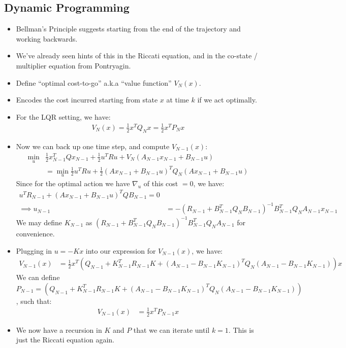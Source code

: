 \subsection{Dynamic Programming}
\begin{itemize}
    \item Bellman's Principle suggests starting from the end of the trajectory and working backwards. 
    \item We've already seen hints of this in the Riccati equation, and in the co-state / multiplier equation from Pontryagin. 
    \item Define ``optimal cost-to-go'' a.k.a ``value function'' $V_N(x)$.
    \item Encodes the cost incurred starting from state $x$ at time $k$ if we act optimally. 
    \item For the LQR setting, we have: 
    \begin{align}
        V_N(x) = \frac{1}{2} x^T Q_N x = \frac{1}{2} x^T P_N x  
    \end{align}
    \item Now we can back up one time step, and compute $V_{N-1}(x)$:
    \begin{align}
        \min_u & \frac{1}{2} x_{N-1}^T Q x_{N-1} + \frac{1}{2} u^T R u + V_N (A_{N-1} x_{N-1} + B_{N-1} u) \\
        &= \min_u \frac{1}{2} u^T R u + \frac{1}{2} (A x_{N-1} + B_{N-1} u)^T Q_N  (A x_{N-1} + B_{N-1} u)
    \end{align}
    Since for the optimal action we have $\nabla_u $ of this cost $=0$, we have: 
\begin{align}
    u^T R_{N-1} + (A x_{N-1} + B_{N-1} u)^T Q B_{N-1} = 0 \\
    \implies u_{N-1} &= -(R_{N-1} + B_{N-1}^T Q_N B_{N-1})^{-1} B_{N-1}^T Q_N A_{N-1} x_{N-1} 
\end{align}
    We may define $K_{N-1}$ as $(R_{N-1} + B_{N-1}^T Q_N B_{N-1})^{-1} B_{N-1}^T Q_N A_{N-1}$ for convenience. 
    \item Plugging in $u=-Kx$ into our expression for $V_{N-1}(x)$, we have: 
    \begin{align}
        V_{N-1}(x) &= \frac{1}{2} x^T (Q_{N-1} + K_{N-1}^T R_{N-1} K + (A_{N-1} - B_{N-1} K_{N-1})^T Q_N (A_{N-1} - B_{N-1} K_{N-1}) ) x
    \end{align}
    We can define $P_{N-1} = (Q_{N-1} + K_{N-1}^T R_{N-1} K + (A_{N-1} - B_{N-1} K_{N-1})^T Q_N (A_{N-1} - B_{N-1} K_{N-1}) )$, such that:
    \begin{align}
        V_{N-1}(x) &= \frac{1}{2} x^T P_{N-1} x 
    \end{align}
    
    \item We now have a recursion in $K$ and $P$ that we can iterate until $k=1$. This is just the Riccati equation again. 
\end{itemize}

